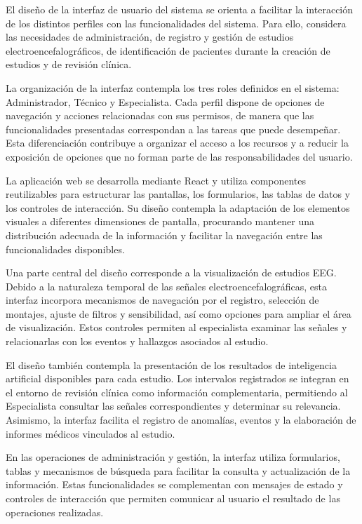 El diseño de la interfaz de usuario del sistema se orienta a facilitar la interacción de los distintos perfiles con las funcionalidades del sistema. Para ello, considera las necesidades de administración, de registro y gestión de estudios electroencefalográficos, de identificación de pacientes durante la creación de estudios y de revisión clínica.

La organización de la interfaz contempla los tres
roles definidos en el sistema: Administrador, Técnico
y Especialista. Cada perfil dispone de opciones de
navegación y acciones relacionadas con sus permisos,
de manera que las funcionalidades presentadas
correspondan a las tareas que puede desempeñar.
Esta diferenciación contribuye a organizar el acceso
a los recursos y a reducir la exposición de opciones
que no forman parte de las responsabilidades del
usuario.

La aplicación web se desarrolla mediante React y
utiliza componentes reutilizables para estructurar
las pantallas, los formularios, las tablas de datos
y los controles de interacción. Su diseño contempla
la adaptación de los elementos visuales a diferentes
dimensiones de pantalla, procurando mantener una
distribución adecuada de la información y facilitar
la navegación entre las funcionalidades disponibles.

Una parte central del diseño corresponde a la
visualización de estudios EEG. Debido a la naturaleza
temporal de las señales electroencefalográficas,
esta interfaz incorpora mecanismos de navegación
por el registro, selección de montajes, ajuste de
filtros y sensibilidad, así como opciones para ampliar
el área de visualización. Estos controles permiten
al especialista examinar las señales y relacionarlas
con los eventos y hallazgos asociados al estudio.


El diseño también contempla la presentación de los resultados de inteligencia artificial disponibles para cada estudio. Los intervalos registrados se integran en el entorno de revisión clínica como información complementaria, permitiendo al Especialista consultar las señales correspondientes y determinar su relevancia. Asimismo, la interfaz facilita el registro de anomalías, eventos y la elaboración de informes médicos vinculados al estudio.


En las operaciones de administración y gestión,
la interfaz utiliza formularios, tablas y mecanismos
de búsqueda para facilitar la consulta y actualización
de la información. Estas funcionalidades se complementan
con mensajes de estado y controles de interacción
que permiten comunicar al usuario el resultado de
las operaciones realizadas.

